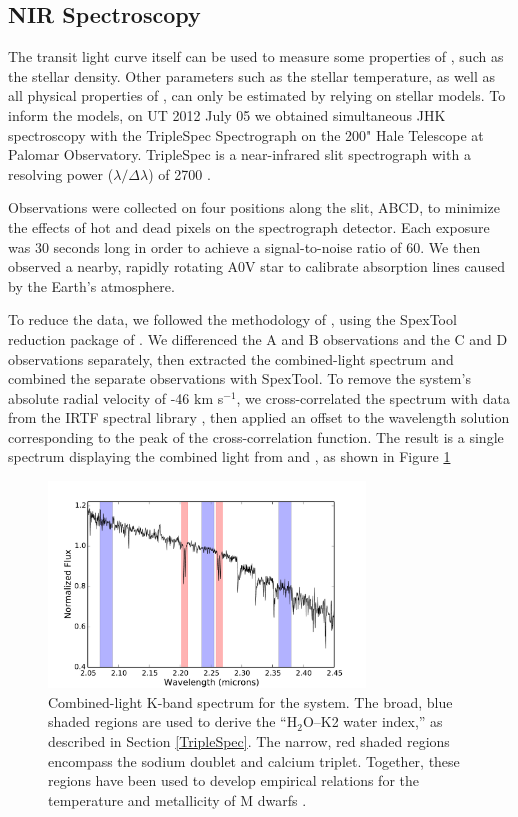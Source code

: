 \subsection{NIR Spectroscopy}

The transit light curve itself can be used to measure some properties of \LA, such as the stellar density.
Other parameters such as the stellar temperature, as well as all physical properties of \LB, can only be estimated by relying on stellar models. 
To inform the models, on UT 2012 July 05 we obtained simultaneous JHK spectroscopy with the TripleSpec Spectrograph on the 200" Hale Telescope at Palomar Observatory. 
TripleSpec is a near-infrared slit spectrograph with a resolving power ($\lambda / \Delta \lambda$) of 2700 \citep{Wilson04, Herter08}. 

Observations were collected on four positions along the slit, ABCD, to minimize the effects of hot and dead pixels on the spectrograph detector. 
Each exposure was 30 seconds long in order to achieve a signal-to-noise ratio of 60.
We then observed a nearby, rapidly rotating A0V star to calibrate absorption lines caused by the Earth's atmosphere.

To reduce the data, we followed the methodology of \citet{Muirhead14}, using the SpexTool reduction package of \citet{Cushing04}. 
We differenced the A and B observations and the C and D observations separately, then extracted the combined-light spectrum and combined the separate observations with SpexTool. 
To remove the system's absolute radial velocity of -46 km s$^{-1}$, we cross-correlated the spectrum with data from the IRTF spectral library \citep{Cushing05, Rayner09}, then applied an offset to the wavelength solution corresponding to the peak of the cross-correlation function. 
The result is a single spectrum displaying the combined light from \LA{} and \LB, as shown in Figure \ref{TripleSpecPlot}

\begin{figure}[htbp!]
\centerline{\includegraphics[width=0.75\textwidth]{chapter4/f2.pdf}}
\caption[Combined-light K-band spectrum for the \LHS{} system]{Combined-light K-band spectrum for the \LHS{} system.
The broad, blue shaded regions are used to derive the ``H$_2$O--K2 water index,'' as described in Section \ref{TripleSpec}.
The narrow, red shaded regions encompass the sodium doublet and calcium triplet.
Together, these regions have been used to develop empirical relations for the temperature and metallicity of M dwarfs \citep{RojasAyala12}.
  }
\label{TripleSpecPlot}
\end{figure}




